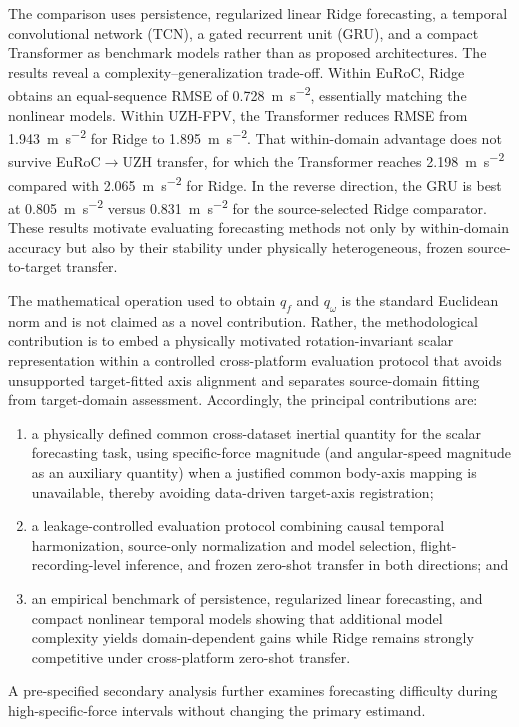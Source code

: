 \documentclass[preprint,12pt]{elsarticle}
\newcommand{\qf}{q_f}
\newcommand{\qw}{q_\omega}
\begin{document}
The comparison uses persistence, regularized linear Ridge forecasting, a temporal convolutional network (TCN), a gated recurrent unit (GRU), and a compact Transformer as benchmark models rather than as proposed architectures. The results reveal a complexity--generalization trade-off. Within EuRoC, Ridge obtains an equal-sequence RMSE of \SI{0.728}{\metre\per\second\squared}, essentially matching the nonlinear models. Within UZH-FPV, the Transformer reduces RMSE from \SI{1.943}{\metre\per\second\squared} for Ridge to \SI{1.895}{\metre\per\second\squared}. That within-domain advantage does not survive EuRoC$\rightarrow$UZH transfer, for which the Transformer reaches \SI{2.198}{\metre\per\second\squared} compared with \SI{2.065}{\metre\per\second\squared} for Ridge. In the reverse direction, the GRU is best at \SI{0.805}{\metre\per\second\squared} versus \SI{0.831}{\metre\per\second\squared} for the source-selected Ridge comparator. These results motivate evaluating forecasting methods not only by within-domain accuracy but also by their stability under physically heterogeneous, frozen source-to-target transfer.

The mathematical operation used to obtain $\qf$ and $\qw$ is the standard Euclidean norm and is not claimed as a novel contribution. Rather, the methodological contribution is to embed a physically motivated rotation-invariant scalar representation within a controlled cross-platform evaluation protocol that avoids unsupported target-fitted axis alignment and separates source-domain fitting from target-domain assessment. Accordingly, the principal contributions are:
\begin{enumerate}[leftmargin=*]
\item a physically defined common cross-dataset inertial quantity for the scalar forecasting task, using specific-force magnitude (and angular-speed magnitude as an auxiliary quantity) when a justified common body-axis mapping is unavailable, thereby avoiding data-driven target-axis registration;
\item a leakage-controlled evaluation protocol combining causal temporal harmonization, source-only normalization and model selection, flight-recording-level inference, and frozen zero-shot transfer in both directions; and
\item an empirical benchmark of persistence, regularized linear forecasting, and compact nonlinear temporal models showing that additional model complexity yields domain-dependent gains while Ridge remains strongly competitive under cross-platform zero-shot transfer.
\end{enumerate}
A pre-specified secondary analysis further examines forecasting difficulty during high-specific-force intervals without changing the primary estimand.
\end{document}
